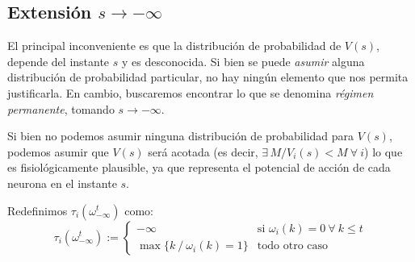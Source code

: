 \subsection{Extensión $s \rightarrow -\infty$} %

El principal inconveniente es que la distribución de probabilidad de $V(s)$, depende del instante $s$ y es desconocida. 
Si bien se puede \emph{asumir} alguna distribución de probabilidad particular, no hay ningún elemento que nos permita justificarla. En cambio, buscaremos encontrar lo que se denomina \emph{régimen permanente}, tomando $s \rightarrow - \infty$.

Si bien no podemos asumir ninguna distribución de probabilidad para $V(s)$, podemos asumir que $V(s)$ será acotada (es decir, $\exists \, M / V_i(s) < M \ \forall \ i$) lo que es fisiológicamente plausible, ya que representa el potencial de acción de cada neurona en el instante $s$.

Redefinimos $\tau_i(\omega_{-\infty}^t)$ como:
\begin{equation}
    \tau_i\left(\omega_{-\infty}^t \right) := \left\{ 
      \begin{array}{cl}
        - \infty & \text{si } \omega_i(k)=0 \ \forall \ k \leq t \\
        \max\{ k \ / \ \omega_i(k)=1 \} & \text{todo otro caso}
      \end{array}
    \right.
\end{equation}

